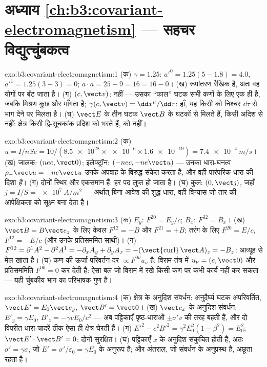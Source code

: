 \section*{अध्याय \ref{ch:b3:covariant-electromagnetism} --- सहचर विद्युत्चुंबकत्व}

\begin{solution}{exo:b3:covariant-electromagnetism:1}
(क) $\gamma = 1.25$: $a'^0 = 1.25(5 - 1.8) = 4.0$, $a'^1 = 1.25(3 -
3) = 0$; $a\cdot a = 25 - 9 = 16 = 16 - 0$। (ख) रूपांतरण
रैखिक है, अतः वह योगों पर बँट जाता है। (ग) $(c, \vect v)$: नहीं ---
उसका ``काल'' घटक सभी कणों के लिए एक ही है, जबकि मिश्रण कुछ और माँगता
है; $\gamma(c, \vect v) = \dd x^\mu/\dd\tau$: हाँ, यह किसी
 को निश्चर $\dd\tau$ से भाग देने पर मिलता है। (घ) $\vect E$ के तीन
घटक $\vect B$ के घटकों से मिलते हैं, किसी अदिश से नहीं: क्षेत्र किसी
द्वि-सूचकांक प्रदिश को भरते हैं,  को नहीं।
\end{solution}

\begin{solution}{exo:b3:covariant-electromagnetism:2}
(क) $u = I/nSe = 10/(\num{8.5e28} \times \num{e-6} \times
\num{1.6e-19}) = \qty{7.4e-4}{m/s}$। (ख) जालक: $(nec, \vect 0)$;
इलेक्ट्रॉन: $(-nec, -ne\vect u)$ --- उनका धारा-घनत्व
$\rho_-\vect u = -ne\vect u$ उनके अपवाह के विरुद्ध संकेत करता है, और
वही पारंपरिक धारा की दिशा \emph{है}। (ग) दोनों स्थिर और एकसमान हैं: हर पद लुप्त हो जाता है। (घ)
कुल: $(0, \vect\jmath)$, जहाँ $j = I/S = \qty{e7}{A/m^2}$ --- अर्थात्
बिना आवेश की शुद्ध धारा, वही विन्यास जो तार की
आपेक्षिकता को सूक्ष्म बना देता है।
\end{solution}

\begin{solution}{exo:b3:covariant-electromagnetism:3}
(क) $E_y$: $F^{20} = E_y/c$; $B_x$: $F^{32} = B_x$। (ख) $\vect B
= B\vect e_z$ के लिए केवल $F^{12} = -B$ और $F^{21} = +B$; तरंग के लिए
$F^{20} = E/c$, $F^{12} = -E/c$ (और उनके प्रतिसममित साथी)। (ग)
$F^{12} = \partial^1A^2 - \partial^2A^1 = -\partial_xA_y +
\partial_yA_x = -(\operatorname{\vect{curl}}\vect A)_z = -B_z$:
आव्यूह से मेल खाता है। (घ) कण की ऊर्जा-परिवर्तन-दर
$\propto F^{0\nu}u_\nu$ है; विराम-तंत्र में $u_\nu = (c, \vect 0)$ और
प्रतिसममिति $F^{00} = 0$ कर देती है: ऐसा बल जो विराम में रखे किसी कण
पर कभी कार्य नहीं कर सकता --- यही चुंबकीय भाग का परिभाषक गुण है।
\end{solution}

\begin{solution}{exo:b3:covariant-electromagnetism:4}
(क) क्षेत्र के अनुदिश संवर्धन: अनुदैर्घ्य घटक अपरिवर्तित, $\vect
E' = E_0\vect e_y$, $\vect B' = \vect 0$। (ख) $\vect
e_x$ के अनुदिश संवर्धन: $E'_y = \gamma E_0$, $B'_z = -\gamma vE_0/c^2$ ---
अब पट्टिकाएँ पृष्ठ-धाराओं $\pm\sigma'v$ की तरह बहती हैं, और दो विपरीत
धारा-चादरें ठीक ऐसा ही क्षेत्र घेरती हैं। (ग) $E'^2 - c^2B'^2 =
\gamma^2E_0^2(1 - \beta^2) = E_0^2$; $\vect E'\cdot\vect B' = 0$:
दोनों सुरक्षित। (घ) पट्टिकाएँ $x$ के अनुदिश संकुचित होती हैं, अतः $\sigma' =
\gamma\sigma$, जो $E' = \sigma'/\varepsilon_0 = \gamma
E_0$ के अनुरूप है; और अंतराल, जो संवर्धन के अनुप्रस्थ है, अछूता रहता है।
\end{solution}

